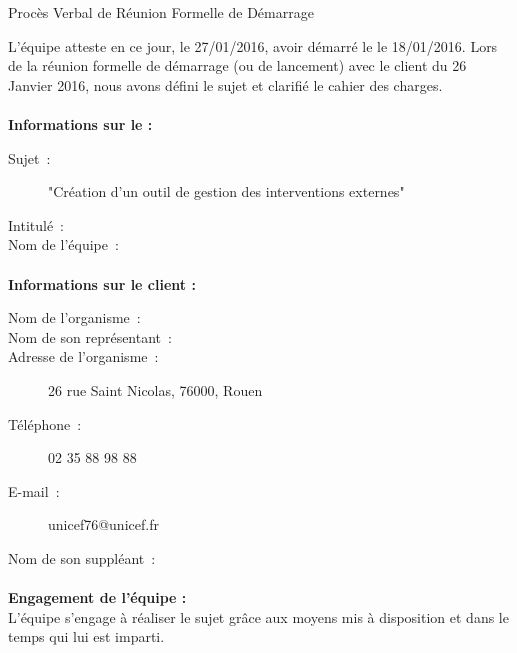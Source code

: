 \documentclass[asi, sansVersion]{picINSA}
\begin{document}
 
 \begin{center}
  \LARGE{}
    Procès Verbal de Réunion Formelle de Démarrage\\
 \end{center}
 
 \normalsize{}
 
L'équipe \nomEquipe{} atteste en ce jour, le 27/01/2016, avoir démarré le \PIC{} le 18/01/2016.
Lors de la réunion formelle de démarrage (ou de lancement) avec le client du 26 Janvier 2016, nous avons défini le sujet et clarifié le cahier des charges.


\paragraph{}
\textbf{Informations sur le \PICCourt{} :}

\begin{description}
  \item[Sujet~:]"Création d'un outil de gestion des interventions externes"
  \item[Intitulé~:]      \PICCourt{} \nomPIC
  \item[Nom de l'équipe~:]  \nomEquipe
\end{description}

\paragraph{}
\textbf{Informations sur le client :}

\begin{description}
\item[Nom de l'organisme~:] \nomPIC
\item[Nom de son représentant~:] \representantClient
\item[Adresse de l'organisme~:] 26 rue Saint Nicolas, 76000, Rouen
\item[Téléphone~:] 02 35 88 98 88
\item[E-mail~:] unicef76@unicef.fr
\item[Nom de son suppléant~:] 
\end{description}

\paragraph{}
\textbf{Engagement de l'équipe :}\\


L'équipe \nomEquipe{} s'engage à réaliser le sujet grâce aux moyens mis à disposition et dans le temps qui lui est imparti.
\end{document}
